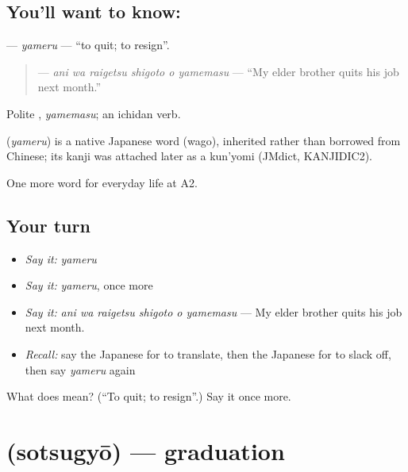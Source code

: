 \subsection*{You'll want to know: }
\textbf{} — \emph{yameru} — \textquotedblleft{}to quit; to resign\textquotedblright{}.

\begin{quote}
\textbf{   } — \emph{ani wa raigetsu shigoto o yamemasu} — \textquotedblleft{}My elder brother quits his job next month.\textquotedblright{}
\end{quote}

Polite \textbf{}, \emph{yamemasu}; an ichidan verb.

\begin{cousinweb}
\textbf{} (\emph{yameru}) is a native Japanese word (wago), inherited rather than borrowed from Chinese; its kanji was attached later as a kun'yomi (JMdict, KANJIDIC2).
\end{cousinweb}

\begin{grammarlens}[title={What you've built}]
One more word for everyday life at A2.
\end{grammarlens}

\subsection*{Your turn}
\begin{itemize}
\raggedright
  \item \emph{Say it:} \emph{yameru}
  \item \emph{Say it:} \emph{yameru}, once more
  \item \emph{Say it:} \emph{ani wa raigetsu shigoto o yamemasu} — My elder brother quits his job next month.
  \item \emph{Recall:} say the Japanese for to translate, then the Japanese for to slack off, then say \emph{yameru} again
\end{itemize}

\begin{tcolorbox}[breakable,colback=teal!4,colframe=teal!35!black,title={Before you move on}]
What does  mean? (\textquotedblleft{}To quit; to resign\textquotedblright{}.) Say it once more.
\end{tcolorbox}
\section[\texorpdfstring{\ja{そつぎょう} (sotsugyō)}{そつぎょう (sotsugyō)}]{ (sotsugyō) — graduation}

